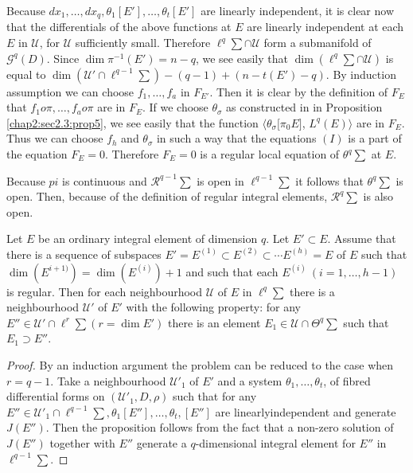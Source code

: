Because $dx_1,  \ldots ,  dx_q,  \theta_1 [E'],  \ldots ,  \theta_t
[E']$ are linearly independent,  it is clear now that the
differentials of the above functions at $E$ are linearly independent
at each $E$ in $\mathscr{U}$,  for $\mathscr{U}$ sufficiently\pageoriginale
small. Therefore $\ell^q \sum \cap \mathscr{U}$ form a submanifold of
$\mathscr{G}^q (D)$. Since $\dim \pi^{-1} (E') = n - q $,  we see
easily that $\dim (\ell^q \sum \cap \mathscr{U})$ is equal to $\dim
(\mathscr{U}' \cap \ell^{q-1} \sum ) - (q-1)+ (n-t(E') -q)$. By
induction assumption we can choose $f_1,  \ldots,  f_a$ in
$F_{E'}$. Then it is clear by the definition of $F_E$ that  $f_1 o
\pi,  \ldots ,  f_a o \pi$ are in $F_E$. If we choose $\theta_\sigma$ as
constructed in in Proposition \ref{chap2:sec2.3:prop5},  we see easily that the function
$\langle \theta_\sigma \big [\pi_0 E \big ]$,  $L^q (E) \rangle$ are in
$F_E$. Thus we can choose $f_h$ and $\theta_\sigma$ in such a way that
the equations $(I)$ is a part of the equation $F_E = 0$. Therefore
$F_E = 0$ is a regular local equation of $\theta^q \sum$ at $E$.  

Because $pi$ is continuous and $\mathscr{R}^{q-1} \sum$ is open in
$\ell^{q-1} \sum$ it follows that $\theta^q \sum$ is open. Then,
because of the definition of regular integral elements,
$\mathscr{R}^q \sum$ is also open. 

\begin{proposition}\label{chap2:sec2.4:prop8} %
  Let $E$ be an ordinary integral element of dimension $q$. Let $E'
  \subset E$. Assume that there is a sequence of subspaces $E' =
  E^{(1)} \subset E^{(2)} \subset \cdots E^{(h)} = E$ of $E$  such
  that $\dim (E^{i +1)}) = \dim (E^{(i)}) + 1$ and such that each
  $E^{(i)} ~ (i = 1,  \ldots ,  h-1)$ is regular. Then for each
  neighbourhood $\mathscr{U}$ of $E$ in $\ell^q \sum$ there is a
  neighbourhood $\mathscr{U}'$ of $E'$ with the following property:
  for any $E'' \in \mathscr{U}' \cap \ell ^r \sum (r = \dim E')$ there
  is an element $E_1 \in \mathscr{U} \cap \Theta^q \sum$ such
  that $E_1 \supset E''$. 
\end{proposition}

\begin{proof}
  By an induction argument the problem can be reduced to the case when
  $r = q-1$. Take a neighbourhood $\mathscr{U}'_1$ of $E'$ and a
  system $\theta_1,  \ldots ,  \theta_t$,  of fibred differential
  forms on $(\mathscr{U}'_1 ,  D,  \rho)$ such that for any $E'' \in
  \mathscr{U}'_1 \cap \ell^{q-1} \sum,  \theta_1 [E''],  \ldots,
  \theta_t,  [E'']$ are linearly\pageoriginale independent and generate $J(E'')
  $. Then the proposition follows from the fact that a non-zero
  solution of $J(E'')$ together with   $E''$ generate a $q$-dimensional
  integral element for $E''$ in $\ell^{q-1} \sum$. 
\end{proof}

